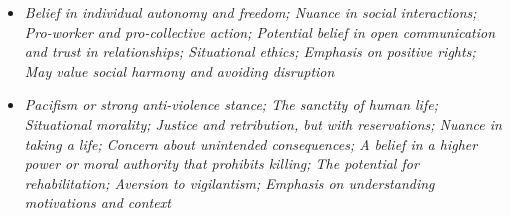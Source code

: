 \documentclass[11pt]{article}
\newcommand{\profiletext}[1]{\textit{#1}}
\begin{document}
\begin{itemize}
\item \profiletext{Belief in individual autonomy and freedom; Nuance in social interactions; Pro-worker and pro-collective action; Potential belief in open communication and trust in relationships; Situational ethics; Emphasis on positive rights; May value social harmony and avoiding disruption}
\item \profiletext{Pacifism or strong anti-violence stance; The sanctity of human life; Situational morality; Justice and retribution, but with reservations; Nuance in taking a life; Concern about unintended consequences; A belief in a higher power or moral authority that prohibits killing; The potential for rehabilitation; Aversion to vigilantism; Emphasis on understanding motivations and context}
\end{itemize}
\end{document}
